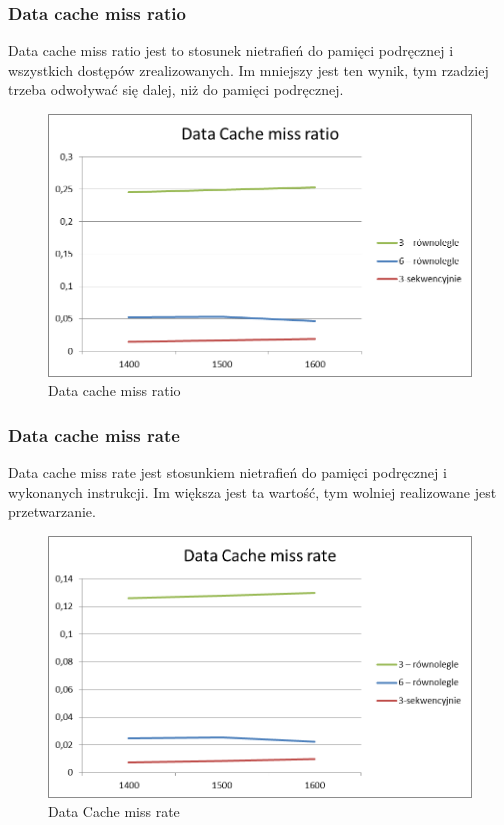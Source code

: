 \documentclass{article}
\begin{document}
\subsubsection{Data cache miss ratio}
Data cache miss ratio jest to stosunek nietrafień do pamięci podręcznej i wszystkich dostępów zrealizowanych. Im mniejszy jest ten wynik, tym rzadziej trzeba odwoływać się dalej, niż do pamięci podręcznej. 

\begin{figure}[H]
	\centering
	\includegraphics[width=\linewidth]{./images/wykresy/miss_ratio.png}
	\caption{Data cache miss ratio}
	\label{fig:wykres2}
\end{figure}

\subsubsection{Data cache miss rate}
Data cache miss rate jest stosunkiem nietrafień do pamięci podręcznej i wykonanych instrukcji. Im większa jest ta wartość, tym wolniej realizowane jest przetwarzanie.  

\begin{figure}[H]
	\centering
	\includegraphics[width=\linewidth]{./images/wykresy/miss_rate.png}
	\caption{Data Cache miss rate}
	\label{fig:wykres3}
\end{figure}
\end{document}
